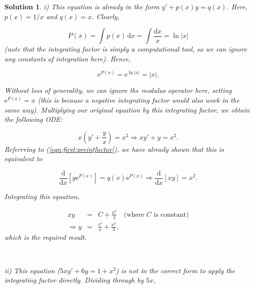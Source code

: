 \documentclass[a4paper]{report}
\newtheorem*{solution}{Solution}
\begin{document}
\begin{solution}
\noindent i) This equation is already in the form $y' + p(x)y = q(x)$. Here, $p(x)=1/x$ and $q(x)=x$. Clearly,

\begin{displaymath}
P(x) = \int p(x)\,\mathrm{d}x= \int \frac{\mathrm{d}x}{x}= \ln |x|
\end{displaymath} 
\noindent (note that the integrating factor is simply a computational tool, so we can ignore any constants of integration here). Hence,

\begin{displaymath}
\mathrm{e}^{P(x)} = \mathrm{e}^{\ln|x|} = |x|.
\end{displaymath}

\noindent Without loss of generality, we can ignore the modulus operator here, setting $\displaystyle{\mathrm{e}^{P(x)}=x}$ (this is because a negative integrating factor would also work in the same way). Multiplying our original equation by this integrating factor, we obtain the following ODE:

\begin{displaymath}
x\left(y'+\frac{y}{x}\right) = x^2 \Longrightarrow xy' + y = x^2.
\end{displaymath}
\noindent Referrring to (\ref{eqn:first:preintfactor}), we have already shown that this is equivalent to

\begin{displaymath}
\frac{\mathrm{d}}{\mathrm{d}x}\left[y\mathrm{e}^{P(x)}\right] = q(x) \mathrm{e}^{P(x)} \Longrightarrow \frac{\mathrm{d}}{\mathrm{d}x}\left[xy\right] = x^2.
\end{displaymath}

\noindent Integrating this equation,

\begin{eqnarray*}
xy &=& C+ \frac{x^3}{3}\quad\mbox{(where $C$ is constant)}\\
\Longrightarrow y &=& \frac{C}{x} +\frac{x^2}{3},
\end{eqnarray*}
\noindent which is the required result.\\

\par \noindent [{\bf Check:} $\displaystyle{y'+\frac{y}{x}=-\frac{C}{x^2}+\frac{2x}{3}+\frac{C}{x^2}+\frac{x}{3}=x}$, as required.] \\

\par \noindent ii) This equation ($\displaystyle{5xy'+6y = 1+x^2}$) is not in the correct form to apply the integrating factor directly. Dividing through by $5x$,


\end{solution}
\end{document}
